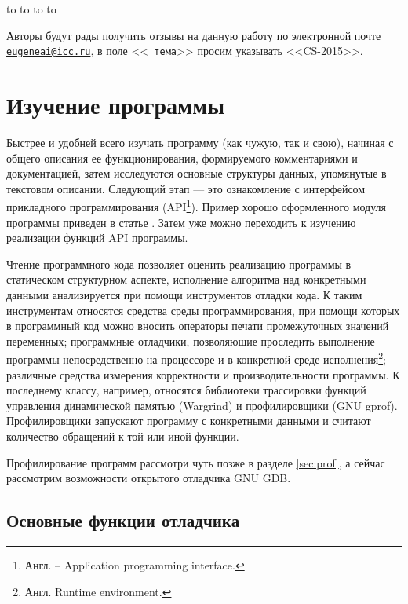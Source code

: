 \documentclass[14pt, openany, twoside, draft]{extbook} %
\begin{document}
\medskip
\noindent\hbox to \linewidth{\hfill\sf Старший~научный сотрудник ИДСТУ СО РАН,}
\noindent\hbox to \linewidth{\hfill\sf доцент кафедры ИТ ИМЭИ ИГУ}
\noindent\hbox to \linewidth{\hfill\sf кандидат~технических~наук}
\noindent\hbox to \linewidth{\hfill\sf Е.~А.~Черкашин}

\vfill
\makeatletter
{} Авторы будут рады получить отзывы на данную
работу по электронной почте
\href{mailto:eugeneai@icc.ru}{\tt{}eugeneai@icc.ru}, в поле <<{\tt
  тема}>> просим указывать <<CS-2015>>.
\makeatother

\chapter{Изучение программы}

Быстрее и удобней всего изучать программу (как чужую, так и свою),
начиная с общего описания ее функционирования, формируемого
комментариями и документацией, затем исследуются основные структуры
данных, упомянутые в текстовом описании.  Следующий этап --- это
ознакомление с интерфейсом прикладного
программирования (API\footnote{Англ. -- Application programming
  interface.}).  Пример хорошо оформленного модуля программы
приведен в статье \cite{fogel2009}.  Затем уже можно переходить к
изучению реализации функций API программы.

Чтение программного кода позволяет оценить реализацию программы в
статическом структурном аспекте, исполнение алгоритма над конкретными
данными анализируется при помощи инструментов отладки кода.  К таким
инструментам относятся средства среды программирования, при помощи
которых в программный код можно вносить операторы печати промежуточных
значений переменных; программные отладчики, позволяющие проследить
выполнение программы непосредственно на процессоре и в конкретной
среде исполнения\footnote{Англ. Runtime environment.}; различные
средства измерения корректности и производительности программы.  К
последнему классу, например, относятся библиотеки трассировки функций
управления динамической памятью (Wargrind) и профилировщики (GNU
gprof).  Профилировщики запускают программу с конкретными данными и
считают количество обращений к той или иной функции.

Профилирование программ рассмотри чуть позже в разделе \ref{sec:prof},
а сейчас рассмотрим возможности открытого отладчика GNU GDB.

\section{Основные функции отладчика}
\end{document}
